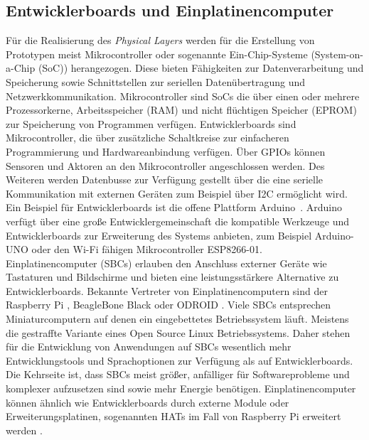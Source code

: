 \documentclass[BMR,Bachelor,ngerman]{twbook}%
\begin{document}
\subsection{Entwicklerboards und Einplatinencomputer} 
Für die Realisierung des \emph{Physical Layers} werden für die Erstellung von Prototypen meist Mikrocontroller oder sogenannte Ein-Chip-Systeme (System-on-a-Chip (SoC)) herangezogen. Diese bieten Fähigkeiten zur Datenverarbeitung und Speicherung sowie Schnittstellen zur seriellen Datenübertragung und Netzwerkkommunikation. Mikrocontroller sind SoCs die über einen oder mehrere Prozessorkerne, Arbeitsspeicher (RAM) und nicht flüchtigen Speicher (EPROM) zur Speicherung von Programmen verfügen. Entwicklerboards sind Mikrocontroller, die über zusätzliche Schaltkreise zur einfacheren Programmierung und Hardwareanbindung verfügen. Über \acfp{GPIO} können Sensoren und Aktoren an den Mikrocontroller angeschlossen werden. Des Weiteren werden Datenbusse zur Verfügung gestellt über die eine serielle Kommunikation mit externen Geräten zum Beispiel über \ac{I2C} ermöglicht wird. Ein Beispiel für Entwicklerboards ist die offene Plattform Arduino \cite{arduino2018}. Arduino verfügt über eine große Entwicklergemeinschaft die kompatible Werkzeuge und Entwicklerboards zur Erweiterung des Systems anbieten, zum Beispiel Arduino-UNO oder den Wi-Fi fähigen Mikrocontroller ESP8266-01.\\\newline
Einplatinencomputer (\acp{SBC}) erlauben den Anschluss externer Geräte wie Tastaturen und Bildschirme und bieten eine leistungsstärkere Alternative zu Entwicklerboards. Bekannte Vertreter von Einplatinencomputern sind der Raspberry Pi \cite{rpi2018}, BeagleBone Black \cite{beaglebone2018} oder ODROID \cite{odroid2018}. Viele SBCs entsprechen Miniaturcomputern auf denen ein eingebettetes Betriebssystem läuft. Meistens die gestraffte Variante eines Open Source Linux Betriebssystems. Daher stehen für die Entwicklung von Anwendungen auf SBCs wesentlich mehr Entwicklungstools und Sprachoptionen zur Verfügung als auf Entwicklerboards. Die Kehrseite ist, dass SBCs meist größer, anfälliger für Softwareprobleme und komplexer aufzusetzen sind sowie mehr Energie benötigen. Einplatinencomputer können ähnlich wie Entwicklerboards durch externe Module oder Erweiterungsplatinen, sogenannten HATs im Fall von Raspberry Pi erweitert werden \cite{hardware2018}.
%
\end{document}
